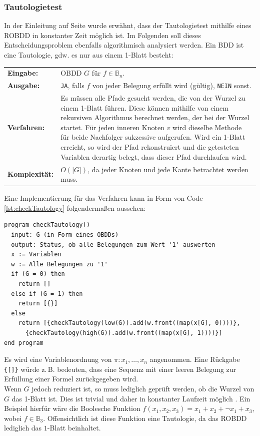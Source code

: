 \subsubsection{Tautologietest}
\label{sec:tautologietest}
In der Einleitung auf Seite \pageref{sec:einleitung} wurde erwähnt, dass der Tautologietest mithilfe eines ROBDD in konstanter Zeit möglich ist. Im Folgenden soll dieses Entscheidungsproblem ebenfalls algorithmisch analysiert werden. Ein BDD ist eine Tautologie, gdw. es nur aus einem 1-Blatt besteht:\\
\begin{tabular}{l|p{12cm}}
	\textbf{Eingabe:} & OBDD $G$ für $f \in \mathbb{B}_n$. \\ 
	\textbf{Ausgabe:} & \texttt{JA}, falls $f$ von jeder Belegung erfüllt wird (gültig), \texttt{NEIN} sonst. \\ 
	\textbf{Verfahren:} & Es müssen alle Pfade gesucht werden, die von der Wurzel zu einem 1-Blatt führen. Diese können mithilfe von einem rekursiven Algorithmus berechnet werden, der bei der Wurzel startet. Für jeden inneren Knoten $v$ wird dieselbe Methode für beide Nachfolger sukzessive aufgerufen. Wird ein 1-Blatt erreicht, so wird der Pfad rekonstruiert und die getesteten Variablen derartig belegt, dass dieser Pfad durchlaufen wird.\\
	\textbf{Komplexität:} & $O(|G|)$, da jeder Knoten und jede Kante betrachtet werden muss.
\end{tabular}
Eine Implementierung für das Verfahren kann in Form von Code \ref{lst:checkTautology} folgendermaßen aussehen:
\lstset{language=xml}
\begin{lstlisting}[frame=htrbl, caption={Implementierung von {\ttfamily checkTautology}}, label={lst:checkTautology}]
program checkTautology()
  input: G (in Form eines OBDDs)
  output: Status, ob alle Belegungen zum Wert '1' auswerten
  x := Variablen
  w := Alle Belegungen zu '1'
  if (G = 0) then
    return []
  else if (G = 1) then 
    return [{}]
  else 
    return [{checkTautology(low(G)).add(w.front((map(x[G], 0))))},
      {checkTautology(high(G)).add(w.front((map(x[G], 1))))}]
end program
\end{lstlisting}
Es wird eine Variablenordnung von $\pi : x_1, \dots, x_n$ angenommen. Eine Rückgabe \texttt{\{[]\}} würde z.\,B. bedeuten, dass eine Sequenz mit einer leeren Belegung zur Erfüllung einer Formel zurückgegeben wird.\\
Wenn $G$ jedoch reduziert ist, so muss lediglich geprüft werden, ob die Wurzel von $G$ das 1-Blatt ist. Dies ist trivial und daher in konstanter Laufzeit möglich \cite[S.38]{s2007}. Ein Beispiel hierfür wäre die Boolesche Funktion $f(x_1, x_2, x_3) = x_1 + x_2 + \neg x_1 + x_3$, wobei $f \in \mathbb{B}_3$. Offensichtlich ist diese Funktion eine Tautologie, da das ROBDD lediglich das $1$-Blatt beinhaltet.\\
